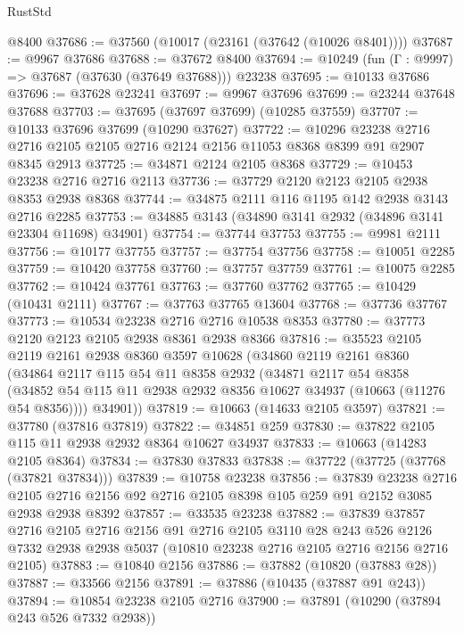 \begin{lexlean}{RustStd}
\begin{coremodule}
    @8400
@37686 := @37560 (@10017 (@23161 (@37642 (@10026 @8401))))
@37687 := @9967 @37686
@37688 := @37672 @8400
@37694 := @10249 (fun (Γ : @9997) => @37687 (@37630 (@37649 @37688))) @23238
@37695 := @10133 @37686
@37696 := @37628 @23241
@37697 := @9967 @37696
@37699 := @23244 @37648 @37688
@37703 := @37695 (@37697 @37699) (@10285 @37559)
@37707 := @10133 @37696 @37699 (@10290 @37627)
@37722 := @10296
    @23238
    @2716
    @2716
    @2105
    @2105
    @2716
    @2124
    @2156
    @11053
    @8368
    @8399
    @91
    @2907
    @8345
    @2913
@37725 := @34871 @2124 @2105 @8368
@37729 := @10453 @23238 @2716 @2716 @2113
@37736 := @37729 @2120 @2123 @2105 @2938 @8353 @2938 @8368
@37744 := @34875 @2111 @116 @1195 @142 @2938 @3143 @2716 @2285
@37753 := @34885 @3143 (@34890 @3141 @2932 (@34896 @3141 @23304 @11698) @34901)
@37754 := @37744 @37753
@37755 := @9981 @2111
@37756 := @10177 @37755
@37757 := @37754 @37756
@37758 := @10051 @2285
@37759 := @10420 @37758
@37760 := @37757 @37759
@37761 := @10075 @2285
@37762 := @10424 @37761
@37763 := @37760 @37762
@37765 := @10429 (@10431 @2111)
@37767 := @37763 @37765 @13604
@37768 := @37736 @37767
@37773 := @10534 @23238 @2716 @2716 @10538 @8353
@37780 := @37773 @2120 @2123 @2105 @2938 @8361 @2938 @8366
@37816 := @35523
    @2105
    @2119
    @2161
    @2938
    @8360
    @3597
    @10628
    (@34860
      @2119
      @2161
      @8360
      (@34864
        @2117
        @115
        @54
        @11
        @8358
        @2932
        (@34871
          @2117
          @54
          @8358
          (@34852 @54 @115 @11 @2938 @2932 @8356 @10627 @34937 (@10663 (@11276 @54 @8356))))
        @34901))
@37819 := @10663 (@14633 @2105 @3597)
@37821 := @37780 (@37816 @37819)
@37822 := @34851 @259
@37830 := @37822 @2105 @115 @11 @2938 @2932 @8364 @10627 @34937
@37833 := @10663 (@14283 @2105 @8364)
@37834 := @37830 @37833
@37838 := @37722 (@37725 (@37768 (@37821 @37834)))
@37839 := @10758 @23238
@37856 := @37839
    @23238
    @2716
    @2105
    @2716
    @2156
    @92
    @2716
    @2105
    @8398
    @105
    @259
    @91
    @2152
    @3085
    @2938
    @2938
    @8392
@37857 := @33535 @23238
@37882 := @37839
    @37857
    @2716
    @2105
    @2716
    @2156
    @91
    @2716
    @2105
    @3110
    @28
    @243
    @526
    @2126
    @7332
    @2938
    @2938
    @5037
    (@10810 @23238 @2716 @2105 @2716 @2156 @2716 @2105)
@37883 := @10840 @2156
@37886 := @37882 (@10820 (@37883 @28))
@37887 := @33566 @2156
@37891 := @37886 (@10435 (@37887 @91 @243))
@37894 := @10854 @23238 @2105 @2716
@37900 := @37891 (@10290 (@37894 @243 @526 @7332 @2938))

\end{coremodule}
\end{lexlean}

